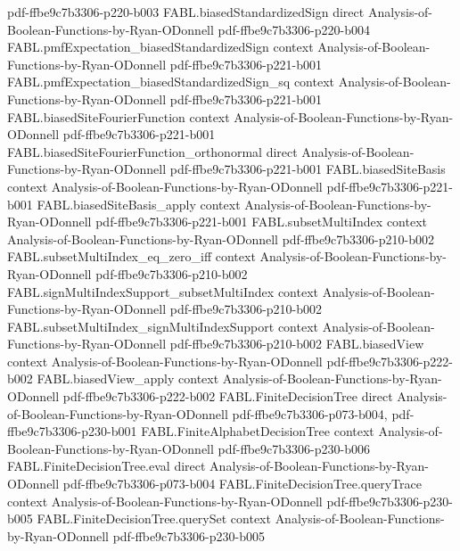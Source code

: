 \begin{theorem}
  {pdf-ffbe9c7b3306-p220-b003}
\proofstep
  {FABL.biasedStandardizedSign}
  {direct}
  {Analysis-of-Boolean-Functions-by-Ryan-ODonnell}
  {pdf-ffbe9c7b3306-p220-b004}
\proofstep
  {FABL.pmfExpectation_biasedStandardizedSign}
  {context}
  {Analysis-of-Boolean-Functions-by-Ryan-ODonnell}
  {pdf-ffbe9c7b3306-p221-b001}
\proofstep
  {FABL.pmfExpectation_biasedStandardizedSign_sq}
  {context}
  {Analysis-of-Boolean-Functions-by-Ryan-ODonnell}
  {pdf-ffbe9c7b3306-p221-b001}
\proofstep
  {FABL.biasedSiteFourierFunction}
  {context}
  {Analysis-of-Boolean-Functions-by-Ryan-ODonnell}
  {pdf-ffbe9c7b3306-p221-b001}
\proofstep
  {FABL.biasedSiteFourierFunction_orthonormal}
  {direct}
  {Analysis-of-Boolean-Functions-by-Ryan-ODonnell}
  {pdf-ffbe9c7b3306-p221-b001}
\proofstep
  {FABL.biasedSiteBasis}
  {context}
  {Analysis-of-Boolean-Functions-by-Ryan-ODonnell}
  {pdf-ffbe9c7b3306-p221-b001}
\proofstep
  {FABL.biasedSiteBasis_apply}
  {context}
  {Analysis-of-Boolean-Functions-by-Ryan-ODonnell}
  {pdf-ffbe9c7b3306-p221-b001}
\proofstep
  {FABL.subsetMultiIndex}
  {context}
  {Analysis-of-Boolean-Functions-by-Ryan-ODonnell}
  {pdf-ffbe9c7b3306-p210-b002}
\proofstep
  {FABL.subsetMultiIndex_eq_zero_iff}
  {context}
  {Analysis-of-Boolean-Functions-by-Ryan-ODonnell}
  {pdf-ffbe9c7b3306-p210-b002}
\proofstep
  {FABL.signMultiIndexSupport_subsetMultiIndex}
  {context}
  {Analysis-of-Boolean-Functions-by-Ryan-ODonnell}
  {pdf-ffbe9c7b3306-p210-b002}
\proofstep
  {FABL.subsetMultiIndex_signMultiIndexSupport}
  {context}
  {Analysis-of-Boolean-Functions-by-Ryan-ODonnell}
  {pdf-ffbe9c7b3306-p210-b002}
\proofstep
  {FABL.biasedView}
  {context}
  {Analysis-of-Boolean-Functions-by-Ryan-ODonnell}
  {pdf-ffbe9c7b3306-p222-b002}
\proofstep
  {FABL.biasedView_apply}
  {context}
  {Analysis-of-Boolean-Functions-by-Ryan-ODonnell}
  {pdf-ffbe9c7b3306-p222-b002}
\proofstep
  {FABL.FiniteDecisionTree}
  {direct}
  {Analysis-of-Boolean-Functions-by-Ryan-ODonnell}
  {pdf-ffbe9c7b3306-p073-b004,
    pdf-ffbe9c7b3306-p230-b001}
\proofstep
  {FABL.FiniteAlphabetDecisionTree}
  {context}
  {Analysis-of-Boolean-Functions-by-Ryan-ODonnell}
  {pdf-ffbe9c7b3306-p230-b006}
\proofstep
  {FABL.FiniteDecisionTree.eval}
  {direct}
  {Analysis-of-Boolean-Functions-by-Ryan-ODonnell}
  {pdf-ffbe9c7b3306-p073-b004}
\proofstep
  {FABL.FiniteDecisionTree.queryTrace}
  {context}
  {Analysis-of-Boolean-Functions-by-Ryan-ODonnell}
  {pdf-ffbe9c7b3306-p230-b005}
\proofstep
  {FABL.FiniteDecisionTree.querySet}
  {context}
  {Analysis-of-Boolean-Functions-by-Ryan-ODonnell}
  {pdf-ffbe9c7b3306-p230-b005}
\proofstep

\end{theorem}
